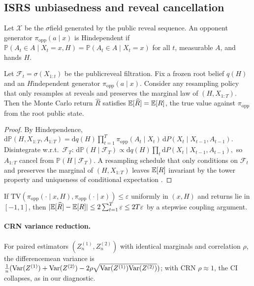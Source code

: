\subsection{IS\textendash RS unbiasedness and reveal cancellation}
\begin{definition}
Let $\mathcal{X}$ be the $\sigma$\textendash field generated by the public reveal sequence. An opponent generator $\pi_{\mathrm{opp}}(a\mid x)$ is H\textendash independent if $\mathbb{P}(A_t\in A\mid X_t=x,H)=\mathbb{P}(A_t\in A\mid X_t=x)$ for all $t$, measurable $A$, and hands $H$.
\end{definition}

\begin{lemma}\label{lem:isrs}
Let $\mathcal{F}_t=\sigma(X_{1:t})$ be the public\textendash reveal filtration. Fix a frozen root belief $q(H)$ and an $H$\textendash independent generator $\pi_{\mathrm{opp}}(a\mid x)$. Consider any resampling policy that only resamples at reveals and preserves the marginal law of $(H,X_{1:T})$. Then the Monte Carlo return $\widehat{R}$ satisfies $\mathbb{E}[\widehat{R}]=\mathbb{E}[R]$, the true value against $\pi_{\mathrm{opp}}$ from the root public state.
\end{lemma}
\begin{proof}
By H\textendash independence,
$
\mathrm{d}\mathbb{P}(H,X_{1:T},A_{1:T})=\mathrm{d}q(H)\prod_{t=1}^T \pi_{\mathrm{opp}}(A_t\mid X_t)\,\mathrm{d}P(X_t\mid X_{t-1},A_{t-1}).
$
Disintegrate w.r.t.\ $\mathcal{F}_T$:
$
\mathrm{d}\mathbb{P}(H\mid \mathcal{F}_T)\propto \mathrm{d}q(H)\prod_t \mathrm{d}P(X_t\mid X_{t-1},A_{t-1}),
$
so $A_{1:T}$ cancel from $\mathbb{P}(H\mid \mathcal{F}_T)$. A resampling schedule that only conditions on $\mathcal{F}_t$ and preserves the marginal of $(H,X_{1:T})$ leaves $\mathbb{E}[R]$ invariant by the tower property and uniqueness of conditional expectation \cite{kallenberg2002fmp}.
\end{proof}

\begin{proposition}
If $\mathrm{TV}(\pi_{\mathrm{opp}}(\cdot\mid x,H),\pi_{\mathrm{opp}}(\cdot\mid x))\le \varepsilon$ uniformly in $(x,H)$ and returns lie in $[-1,1]$, then $|\mathbb{E}[\widehat{R}]-\mathbb{E}[R]|\le 2\sum_{t=1}^T \varepsilon \le 2T\varepsilon$ by a stepwise coupling argument.
\end{proposition}

\paragraph{CRN variance reduction.}
For paired estimators $(Z^{(1)}_n,Z^{(2)}_n)$ with identical marginals and correlation $\rho$, the difference\textendash mean variance is $\frac{1}{n}(\mathrm{Var}(Z^{(1)})+\mathrm{Var}(Z^{(2)})-2\rho\sqrt{\mathrm{Var}(Z^{(1)})\mathrm{Var}(Z^{(2)})})$; with CRN $\rho\approx 1$, the CI collapses, as in our diagnostic.


